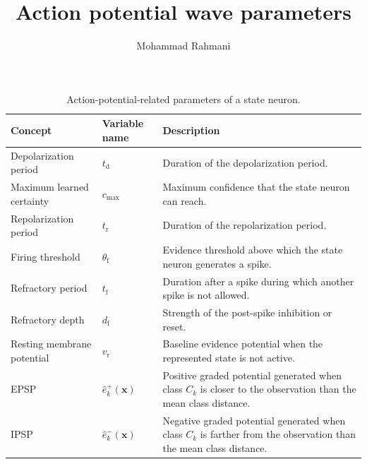 \documentclass[a4paper]{article}
\title{Action potential wave parameters}
\date{}
\author{Mohammad Rahmani}
\begin{document}
   \maketitle

   \begin{table}[H]
      \centering
      \small
      \setlength{\tabcolsep}{4pt}
      \begin{tabular}{p{} p{} p{}}
         \hline
         \textbf{Concept} & \textbf{Variable name} & \textbf{Description} \\
         \hline
         Depolarization period & $t_{\mathrm{d}}$ & Duration of the depolarization period. \\
         Maximum learned certainty & $c_{\max}$ & Maximum confidence that the state neuron can reach. \\
         Repolarization period & $t_{\mathrm{r}}$ & Duration of the repolarization period. \\
         Firing threshold & $\theta_{\mathrm{f}}$ & Evidence threshold above which the state neuron generates a spike. \\
         Refractory period & $t_{\mathrm{f}}$ & Duration after a spike during which another spike is not allowed. \\
         Refractory depth & $d_{\mathrm{f}}$ & Strength of the post-spike inhibition or reset. \\
         Resting membrane potential & $v_{\mathrm{r}}$ & Baseline evidence potential when the represented state is not active. \\
         EPSP & $\hat e_k^{+}(\mathbf{x})$ & Positive graded potential generated when class $C_k$ is closer to the observation than the mean class distance. \\
         IPSP & $\hat e_k^{-}(\mathbf{x})$ & Negative graded potential generated when class $C_k$ is farther from the observation than the mean class distance. \\
         \hline
      \end{tabular}
      \caption{Action-potential-related parameters of a state neuron.}
      \label{table_action_potential_parameters}
   \end{table}


   
   
\end{document}
